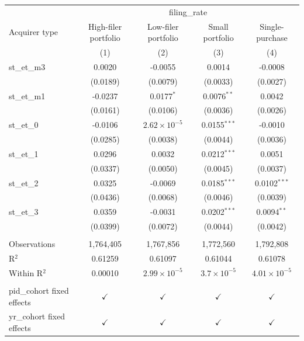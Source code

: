 
\begingroup
\centering
\begin{tabular}{lcccc}
   \toprule
    & \multicolumn{4}{c}{filing\_rate}\\
   Acquirer type              & High-filer portfolio & Low-filer portfolio   & Small portfolio      & Single-purchase \\   
                              & (1)                  & (2)                   & (3)                  & (4)\\  
   \midrule 
   st\_et\_m3                 & 0.0020               & -0.0055               & 0.0014               & -0.0008\\   
                              & (0.0189)             & (0.0079)              & (0.0033)             & (0.0027)\\   
   st\_et\_m1                 & -0.0237              & 0.0177$^{*}$          & 0.0076$^{**}$        & 0.0042\\   
                              & (0.0161)             & (0.0106)              & (0.0036)             & (0.0026)\\   
   st\_et\_0                  & -0.0106              & $2.62\times 10^{-5}$  & 0.0155$^{***}$       & -0.0010\\   
                              & (0.0285)             & (0.0038)              & (0.0044)             & (0.0036)\\   
   st\_et\_1                  & 0.0296               & 0.0032                & 0.0212$^{***}$       & 0.0051\\   
                              & (0.0337)             & (0.0050)              & (0.0045)             & (0.0037)\\   
   st\_et\_2                  & 0.0325               & -0.0069               & 0.0185$^{***}$       & 0.0102$^{***}$\\   
                              & (0.0436)             & (0.0068)              & (0.0046)             & (0.0039)\\   
   st\_et\_3                  & 0.0359               & -0.0031               & 0.0202$^{***}$       & 0.0094$^{**}$\\   
                              & (0.0399)             & (0.0072)              & (0.0044)             & (0.0042)\\   
    \\
   Observations               & 1,764,405            & 1,767,856             & 1,772,560            & 1,792,808\\  
   R$^2$                      & 0.61259              & 0.61097               & 0.61044              & 0.61078\\  
   Within R$^2$               & 0.00010              & $2.99\times 10^{-5}$  & $3.7\times 10^{-5}$  & $4.01\times 10^{-5}$\\   
    \\
   pid\_cohort fixed effects  & $\checkmark$         & $\checkmark$          & $\checkmark$         & $\checkmark$\\   
   yr\_cohort fixed effects   & $\checkmark$         & $\checkmark$          & $\checkmark$         & $\checkmark$\\   
   \bottomrule
\end{tabular}
\par\endgroup


